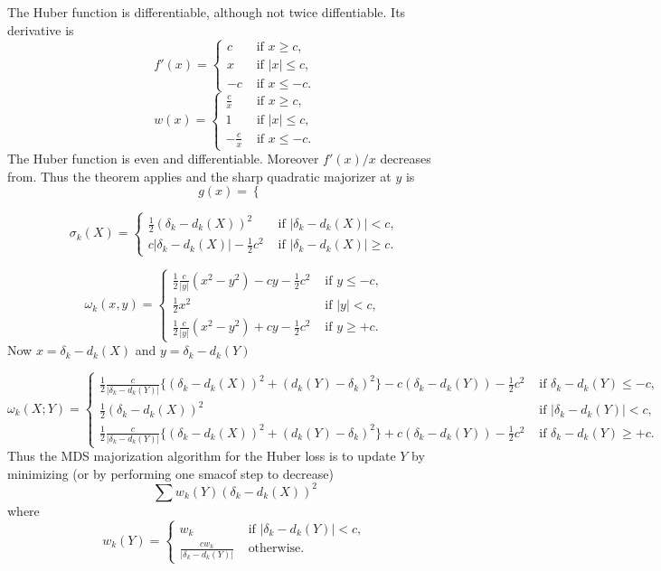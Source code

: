 \documentclass[
  12pt,
  letterpaper,
  DIV=11,
  numbers=noendperiod]{scrartcl}
\begin{document}
The Huber function is differentiable, although not twice diffentiable.
Its derivative is \[
f'(x)=\begin{cases}
c&\text{ if }x\geq c,\\
x&\text{ if }|x|\leq c,\\
-c&\text{ if }x\leq -c.
\end{cases}
\] \[
w(x)=
\begin{cases}
\frac{c}{x}&\text{ if }x\geq c,\\
1&\text{ if }|x|\leq c,\\
-\frac{c}{x}&\text{ if }x\leq -c.
\end{cases}
\] The Huber function is even and differentiable. Moreover \(f'(x)/x\)
decreases from. Thus the theorem applies and the sharp quadratic
majorizer at \(y\) is \[
g(x)=\begin{cases}
\end{cases}
\]

\[
\sigma_k(X)=\begin{cases}
\frac12(\delta_k-d_k(X))^2&\text{ if }|\delta_k-d_k(X)|<c,\\
c|\delta_k-d_k(X)|-\frac12 c^2&\text{ if }|\delta_k-d_k(X)|\geq c.
\end{cases}
\]

\[
\omega_k(x,y)=\begin{cases}
\frac12\frac{c}{|y|}(x^2-y^2)-cy-\frac12c^2&\text{ if }y\leq -c,\\
\frac12x^2&\text{ if }|y|<c,\\
\frac12\frac{c}{|y|}(x^2-y^2)+cy-\frac12c^2&\text{ if }y\geq +c.
\end{cases}
\] Now \(x=\delta_k-d_k(X)\) and \(y=\delta_k-d_k(Y)\)

\[
\omega_k(X;Y)=\begin{cases}
\frac12\frac{c}{|\delta_k-d_k(Y)|}\{(\delta_k-d_k(X))^2+(d_k(Y)-\delta_k)^2\}-c(\delta_k-d_k(Y))-\frac12c^2&\text{ if }\delta_k-d_k(Y)\leq -c,\\
\frac12(\delta_k-d_k(X))^2&\text{ if }|\delta_k-d_k(Y)|<c,\\
\frac12\frac{c}{|\delta_k-d_k(Y)|}\{(\delta_k-d_k(X))^2+(d_k(Y)-\delta_k)^2\}+c(\delta_k-d_k(Y))-\frac12c^2&\text{ if }\delta_k-d_k(Y)\geq +c.
\end{cases}
\] Thus the MDS majorization algorithm for the Huber loss is to update
\(Y\) by minimizing (or by performing one smacof step to decrease) \[
\sum w_k(Y)(\delta_k-d_k(X))^2
\] where \[
w_k(Y)=\begin{cases}
w_k&\text{ if }|\delta_k-d_k(Y)|<c,\\
\frac{cw_k}{|\delta_k-d_k(Y)|}&\text{ otherwise}.
\end{cases}
\]
\end{document}
